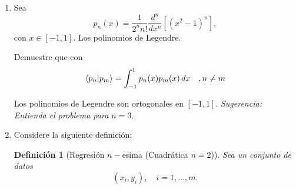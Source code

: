 \documentclass[11pt,a4paper]{article}
\theoremstyle{ejercicio}
\newtheorem{definition}{Definición}
\begin{document}
\begin{enumerate}




%
%
%
%



\item 


Sea
\[
p_n(x)=\frac{1}{2^n n!}\frac{d^n}{dx^n}\left[(x^2-1)^n\right],
\]
con $x\in[-1,1]$. Los polinomios de Legendre.

Demuestre que
con
\[
\braket{p_n|p_m}= \int_{-1}^{1} p_n(x) p_m(x)\,dx 
\quad, n\neq m\]

Los polinomios de Legendre son ortogonales en $[-1,1]$. \textit{Sugerencia: Entienda el problema 
para $n=3$}.





\item Considere la siguiente definición:
\begin{definition}[Regresión $n-$esima (Cuadrática $n=2$)]
Sea un conjunto de datos
\[
(x_i,y_i), \quad i=1,\dots,m.
\]


\end{definition}
\end{enumerate}
\end{document}
